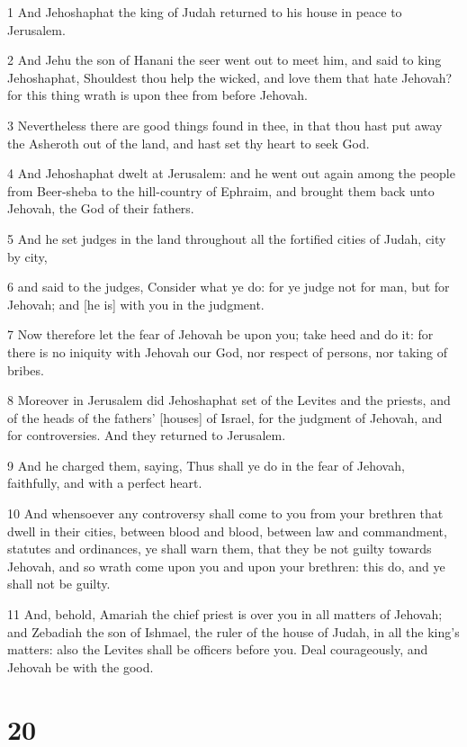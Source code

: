 \par 1 And Jehoshaphat the king of Judah returned to his house in peace to Jerusalem.
\par 2 And Jehu the son of Hanani the seer went out to meet him, and said to king Jehoshaphat, Shouldest thou help the wicked, and love them that hate Jehovah? for this thing wrath is upon thee from before Jehovah.
\par 3 Nevertheless there are good things found in thee, in that thou hast put away the Asheroth out of the land, and hast set thy heart to seek God.
\par 4 And Jehoshaphat dwelt at Jerusalem: and he went out again among the people from Beer-sheba to the hill-country of Ephraim, and brought them back unto Jehovah, the God of their fathers.
\par 5 And he set judges in the land throughout all the fortified cities of Judah, city by city,
\par 6 and said to the judges, Consider what ye do: for ye judge not for man, but for Jehovah; and [he is] with you in the judgment.
\par 7 Now therefore let the fear of Jehovah be upon you; take heed and do it: for there is no iniquity with Jehovah our God, nor respect of persons, nor taking of bribes.
\par 8 Moreover in Jerusalem did Jehoshaphat set of the Levites and the priests, and of the heads of the fathers' [houses] of Israel, for the judgment of Jehovah, and for controversies. And they returned to Jerusalem.
\par 9 And he charged them, saying, Thus shall ye do in the fear of Jehovah, faithfully, and with a perfect heart.
\par 10 And whensoever any controversy shall come to you from your brethren that dwell in their cities, between blood and blood, between law and commandment, statutes and ordinances, ye shall warn them, that they be not guilty towards Jehovah, and so wrath come upon you and upon your brethren: this do, and ye shall not be guilty.
\par 11 And, behold, Amariah the chief priest is over you in all matters of Jehovah; and Zebadiah the son of Ishmael, the ruler of the house of Judah, in all the king's matters: also the Levites shall be officers before you. Deal courageously, and Jehovah be with the good.

\chapter{20}

